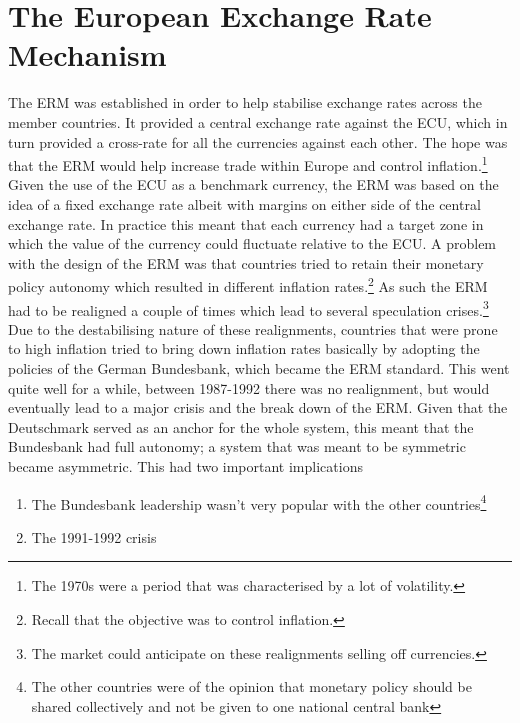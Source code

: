 \documentclass{tufte-handout}
\begin{document}
\section{The European Exchange Rate Mechanism}
The ERM was established in order to help stabilise exchange rates across the member countries.
It provided a central exchange rate against the ECU, which in turn provided a cross-rate for all the currencies against each other. 
The hope was that the ERM would help increase trade within Europe and control inflation.\footnote{The 1970s were a period that was characterised by a lot of volatility.}
Given the use of the ECU as a benchmark currency, the ERM was based on the idea of a fixed exchange rate albeit with margins on either side of the central exchange rate. 
In practice this meant that each currency had a target zone in which the value of the currency could fluctuate relative to the ECU. 
A problem with the design of the ERM was that countries tried to retain their monetary policy autonomy which resulted in different inflation rates.\footnote{Recall that the objective was to control inflation.} 
As such the ERM had to be realigned a couple of times which lead to several speculation crises.\footnote{The market could anticipate on these realignments selling off currencies.}
Due to the destabilising nature of these realignments, countries that were prone to high inflation tried to bring down inflation rates basically by adopting the policies of the German Bundesbank, which became the ERM standard. 
This went quite well for a while, between 1987-1992 there was no realignment, but would eventually lead to a major crisis and the break down of the ERM. 
Given that the Deutschmark served as an anchor for the whole system, this meant that the Bundesbank had full autonomy; a system that was meant to be symmetric became asymmetric. 
This had two important implications
\begin{enumerate}
  \item The Bundesbank leadership wasn't very popular with the other countries\footnote{The other countries were of the opinion that monetary policy should be shared collectively and not be given to one national central bank}
  \item The 1991-1992 crisis
\end{enumerate}
\end{document}
